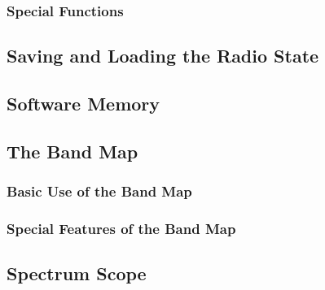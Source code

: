 \subsubsection{Special Functions}


\subsection{Saving and Loading the Radio State}


\subsection{Software Memory}


\subsection{The Band Map}

\subsubsection{Basic Use of the Band Map}

\subsubsection{Special Features of the Band Map}


\subsection{Spectrum Scope}
